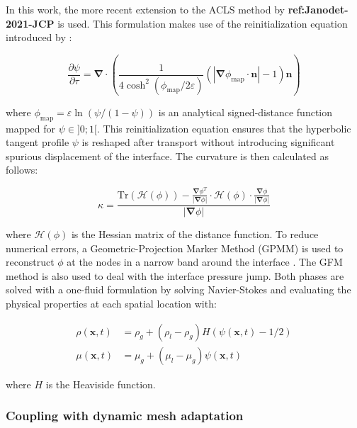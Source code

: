 In this work, the more recent extension to the ACLS method by \textbf{ref:Janodet-2021-JCP} is used. This formulation makes use of the reinitialization equation introduced by :

\begin{equation}
\label{eq:acls_reinit_2017}
\frac{\partial\psi}{\partial \tau}=\boldsymbol{\nabla}\cdot\left(\frac{1}{4\cosh^2{\left(\phi_{\mathrm{map}}/2\varepsilon\right)}}\left(|\boldsymbol{\nabla}\phi_{\mathrm{map}}\cdot\textbf{n}|-1\right)\textbf{n}\right)
\end{equation}

where $\phi_{\mathrm{map}}=\varepsilon\ln\left({\psi}/({1-\psi})\right)$ is an analytical signed-distance function mapped for $\psi \in ]0;1[$. This reinitialization equation ensures that the hyperbolic tangent profile $\psi$ is reshaped after transport without introducing significant spurious displacement of the interface. The curvature is then calculated as follows:

\begin{equation}
\kappa=\frac{\mathrm{Tr}\left(\boldsymbol{\mathcal{H}}(\phi)\right)-\frac{\boldsymbol{\nabla}\phi^T}{|\boldsymbol{\nabla}\phi|}\cdot\boldsymbol{\mathcal{H}}\left(\phi\right)\cdot\frac{\boldsymbol{\nabla}\phi}{|\boldsymbol{\nabla}\phi|}}{|\boldsymbol{\nabla}\phi|}
\label{eq:curvature_Goldman}
\end{equation}

where $\mathcal{H} \left( \phi \right)$ is the Hessian matrix of the distance function. To reduce numerical errors, a Geometric-Projection Marker Method (GPMM) is used to reconstruct $\phi$ at the nodes in a narrow band around the interface . The GFM method is also used to deal with the interface pressure jump. Both phases are solved with a one-fluid formulation by solving Navier-Stokes and evaluating the physical properties at each spatial location with:

\begin{subequations}
\begin{align}
\rho(\textbf{x},t) &= \rho_g+(\rho_l-\rho_g)H(\psi(\textbf{x},t)-1/2)  \\
\mu(\textbf{x},t) &= \mu_g+(\mu_l-\mu_g)\psi(\textbf{x},t)
\end{align}
\end{subequations}

where $H$ is the Heaviside function.


\subsubsection*{Coupling with dynamic mesh adaptation}

